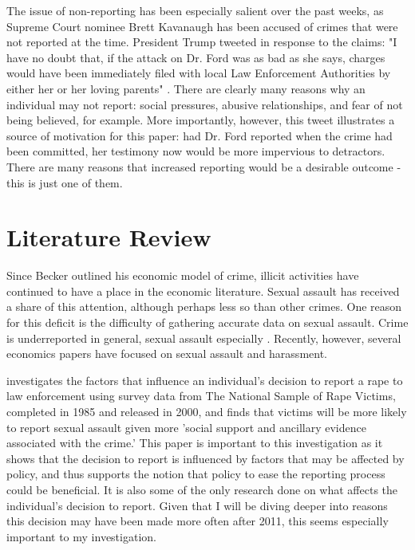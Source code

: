 \documentclass[AER]{AEA}
\begin{document}
The issue of non-reporting has been especially salient over the past weeks, as Supreme Court nominee Brett Kavanaugh has been accused of crimes that were not reported at the time. President Trump tweeted in response to the claims: "I have no doubt that, if the attack on Dr. Ford was as bad as she says, charges would have been immediately filed with local Law Enforcement Authorities by either her or her loving parents" \citeyear{trump_i_2018}. There are clearly many reasons why an individual may not report: social pressures, abusive relationships, and fear of not being believed, for example. More importantly, however, this tweet illustrates a source of motivation for this paper: had Dr. Ford reported when the crime had been committed, her testimony now would be more impervious to detractors. There are many reasons that increased reporting would be a desirable outcome - this is just one of them. 

\section{Literature Review}

Since Becker outlined his economic model of crime, illicit activities have continued to have a place in the economic literature. Sexual assault has received a share of this attention, although perhaps less so than other crimes. One reason for this deficit is the difficulty of gathering accurate data on sexual assault. Crime is underreported in general, sexual assault especially \cite{kilpatrick_drug-facilitated_2007} \cite{fisher_sexual_2000}. Recently, however, several economics papers have focused on sexual assault and harassment. 

 investigates the factors that influence an individual's decision to report a rape to law enforcement using survey data from The National Sample of Rape Victims, completed in 1985 and released in 2000, and finds that victims will be more likely to report sexual assault given more 'social support and ancillary evidence associated with the crime.' This paper is important to this investigation as it shows that the decision to report is influenced by factors that may be affected by policy, and thus supports the notion that policy to ease the reporting process could be beneficial. It is also some of the only research done on what affects the individual's decision to report. Given that I will be diving deeper into reasons this decision may have been made more often after 2011, this seems especially important to my investigation.
\end{document}
